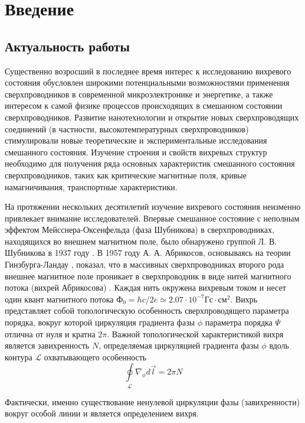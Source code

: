 \chapter{Введение}

\section{Актуальность работы}
Существенно возросший в последнее время интерес к исследованию вихревого 
состояния обусловлен широкими потенциальными возможностями применения 
сверхпроводников в современной микроэлектронике и энергетике, а также 
интересом к самой физике процессов происходящих в смешанном состоянии 
сверхпроводников. Развитие нанотехнологии и открытие новых сверхпроводящих 
соединений (в частности, высокотемпературных сверхпроводников) стимулировали 
новые теоретические и экспериментальные исследования смешанного состояния. 
Изучение строения и свойств вихревых структур необходимо для получения ряда 
основных характеристик смешанного состояния сверхпроводников, таких как 
критические магнитные поля, кривые намагничивания, транспортные 
характеристики.

На протяжении нескольких десятилетий изучение вихревого состояния неизменно 
привлекает внимание исследователей. Впервые смешанное состояние с неполным 
эффектом Мейсснера-Оксенфельда (фаза Шубникова) в сверхпроводниках, 
находящихся во внешнем магнитном поле, было обнаружено группой Л. В. 
Шубникова в 1937 году \cite{shubnikov}. В 1957 году А. А. Абрикосов, 
основываясь на теории Гинзбурга-Ландау \cite{ginzburg-landau}, показал, что в 
массивных сверхпроводниках второго рода внешнее магнитное поле проникает в 
сверхпроводник в виде нитей магнитного потока (вихрей Абрикосова)
\cite{abrikosov}. Каждая нить окружена вихревым током и несет один квант 
магнитного потока 
\( Ф_0 = hc/2e \simeq 2.07\cdot10^{-7} \text{Гс}\cdot\text{см}^2 \). Вихрь 
представляет собой топологическую особенность сверхпроводящего параметра 
порядка, вокруг которой циркуляция градиента фазы \( \phi \) параметра порядка 
\( \Psi \) отлична от нуля и кратна \( 2\pi \). Важной топологической 
характеристикой вихря является завихренность \( N \), определяемая циркуляцией 
градиента фазы \( \phi \) вдоль контура \( \mathcal{L} \) охватывающего 
особенность 
\begin{equation}
    \oint\limits_{\mathcal{L}} \nabla_\phi d\vec{l} = 2\pi N
\end{equation}

Фактически, именно существование ненулевой циркуляции фазы (завихренности) 
вокруг особой линии и является определением вихря.

